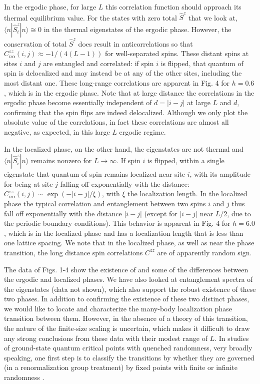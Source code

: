 \documentclass[letterpaper, twocolumn,superscriptaddress, showpacs,preprintnumbers,amsmath,amssymb]{revtex4}
\begin{document}
In the ergodic phase, for large $L$ %
this correlation function
should approach its thermal equilibrium value.  For the states with zero total $\hat S^z$ that we look at, $\langle n | \hat{S}_i^z | n \rangle\cong 0$
in the thermal eigenstates of the ergodic phase.  However, the conservation of total $\hat S^z$ does result in anticorrelations so that
$C_{n\alpha}^{zz}(i,j)\approx -1/(4(L-1))$ for well-separated spins.
These distant spins at sites $i$ and $j$ are entangled and correlated: if spin $i$ is flipped, that quantum
of spin is delocalized and may instead be at any of the other sites, including the most distant one.  These long-range correlations are apparent
in Fig. 4 for $h=0.6$, which is in the ergodic phase.
Note that at large distance the correlations in the ergodic phase become essentially independent of
$d=|i-j|$ at large $L$ and $d$, confirming that the spin flips are indeed delocalized.
Although we only plot the absolute value of the correlations, in fact these correlations
are almost all negative, as expected, in this large $L$ ergodic regime.

In the localized phase, on the other hand, the eigenstates are not thermal and $\langle n | \hat{S}_i^z | n\rangle$ remains nonzero for $L\rightarrow\infty$.
If spin $i$ is flipped, within a single eigenstate that quantum of spin remains localized near site $i$, with its amplitude
for being at site $j$ falling off exponentially with the distance: $C_{n\alpha}^{zz}(i,j)\sim\exp{(-|i-j|/\xi)}$, with $\xi$
the localization length.  In the localized phase the typical correlation and entanglement between two spins $i$ and $j$
thus fall off exponentially with the distance $|i-j|$ (except for $|i-j|$ near $L/2$,
due to the periodic boundary conditions).  This behavior is apparent in Fig. 4
for $h=6.0$, which is in the localized phase and has a localization length
that is less than one lattice spacing.  We note that in the localized phase,
as well as near the phase transition, the long distance
spin correlations $C^{zz}$ are of apparently random sign.


The data of Figs. 1-4 show the existence of and some of the differences between the ergodic and localized phases.
We have also looked at %
entanglement spectra \cite{vadim} of the eigenstates (data not shown), which also support
the robust existence of these two phases. %
In addition to confirming the existence of these two distinct phases,
we would like to locate and characterize the many-body localization phase transition between them.
However, in the absence of a theory of this transition, the nature of the finite-size scaling is uncertain,
which makes it difficult to draw any strong conclusions from these data with their modest range of $L$.
In studies of ground-state quantum critical points with quenched randomness, very broadly speaking, one first step is to
classify the transitions by whether they are governed (in a renormalization group treatment) by fixed points with
finite or infinite randomness \cite{dsf,ssb}.
\end{document}
